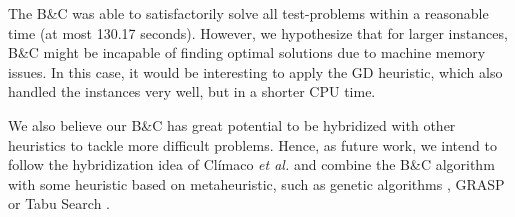 \documentclass{ro}
\begin{document}


The  B\&C was able to satisfactorily solve all test-problems within a reasonable time (at most 130.17 seconds). However,  we hypothesize that for larger instances, B\&C might  be incapable of finding optimal solutions due to machine memory issues. In this case, it would be interesting to apply the GD heuristic, which also handled the instances very well, but in a shorter CPU time.

We also believe our B\&C has great potential to be hybridized with other heuristics to tackle more difficult problems. Hence, as future work, we intend to follow the hybridization idea of Cl\'imaco \textit{et al.}\cite{climaco2018} and combine the B\&C algorithm with some heuristic based on metaheuristic, such as genetic algorithms \cite{kramer2017genetic}, GRASP \cite{resende2016optimization} or Tabu Search \cite{laguna2018tabu}.





\end{document}
